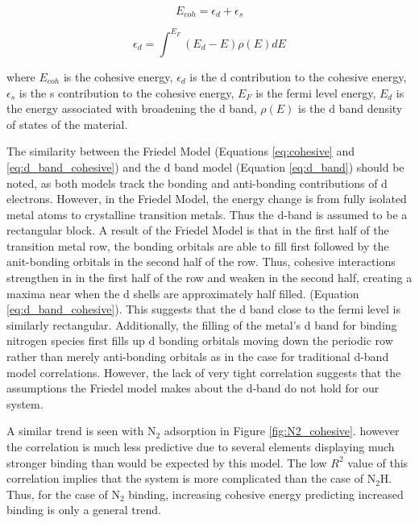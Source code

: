 \begin{equation}
    E_{coh} = \epsilon_d + \epsilon_s
    \label{eq:cohesive}
\end{equation}

\begin{equation}
    \epsilon_d = \int^{E_F} (E_d-E)\rho(E)dE
    \label{eq:d_band_cohesive}
\end{equation}

where $E_{coh}$ is the cohesive energy, $\epsilon_d$ is the d contribution to the cohesive energy, $\epsilon_s$ is the s contribution to the cohesive energy, $E_F$ is the fermi level energy, $E_d$ is the energy associated with broadening the d band, $\rho(E)$ is the d band density of states of the material. 

The similarity between the Friedel Model (Equations \ref{eq:cohesive} and \ref{eq:d_band_cohesive}) and the d band model (Equation \ref{eq:d_band}) should be noted, as both models track the bonding and anti-bonding contributions of d electrons. However, in the Friedel Model, the energy change is from fully isolated metal atoms to crystalline transition metals. Thus the d-band is assumed to be a rectangular block. A result of the Friedel Model is that in the first half of the transition metal row, the bonding orbitals are able to fill first followed by the anit-bonding orbitals in the second half of the row. Thus, cohesive interactions strengthen in in the first half of the row and weaken in the second half, creating a maxima near when the d shells are approximately half filled. (Equation \ref{eq:d_band_cohesive}). This suggests that the d band close to the fermi level is similarly rectangular. Additionally, the filling of the metal's d band for binding nitrogen species first fills up d bonding orbitals moving down the periodic row rather than merely anti-bonding orbitals as in the case for traditional d-band model correlations. However, the lack of very tight correlation suggests that the assumptions the Friedel model makes about the d-band do not hold for our system.



A similar trend is seen with N$_2$ adsorption in Figure \ref{fig:N2_cohesive}. however the correlation is much less predictive due to several elements displaying much stronger binding than would be expected by this model. The low $R^2$ value of this correlation implies that the system is more complicated than the case of N$_2$H. Thus, for the case of N$_2$ binding, increasing cohesive energy predicting increased binding is only a general trend. 

